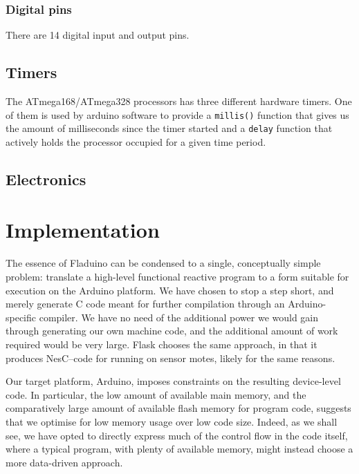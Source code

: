 \documentclass[a4paper,oneside, draft]{memoir}
\begin{document}
\subsection{Digital pins}
There are 14 digital input and output pins.


\section{Timers}
The ATmega168/ATmega328 processors has three different hardware
timers. One of them is used by arduino software to provide a
\texttt{millis()} function that gives us the amount of milliseconds
since the timer started and a \texttt{delay} function that actively
holds the processor occupied for a given time period.


\section{Electronics}

\chapter{Implementation}

The essence of Fladuino can be condensed to a single, conceptually
simple problem: translate a high-level functional reactive program to
a form suitable for execution on the Arduino platform.  We have chosen
to stop a step short, and merely generate C code meant for further
compilation through an Arduino-specific compiler.  We have no need of
the additional power we would gain through generating our own machine
code, and the additional amount of work required would be very large.
Flask chooses the same approach, in that it produces NesC--code for
running on sensor motes, likely for the same reasons.

Our target platform, Arduino, imposes constraints on the resulting
device-level code.  In particular, the low amount of available main
memory, and the comparatively large amount of available flash memory
for program code, suggests that we optimise for low memory usage over
low code size.  Indeed, as we shall see, we have opted to directly
express much of the control flow in the code itself, where a typical
program, with plenty of available memory, might instead choose a more
data-driven approach.
\end{document}
